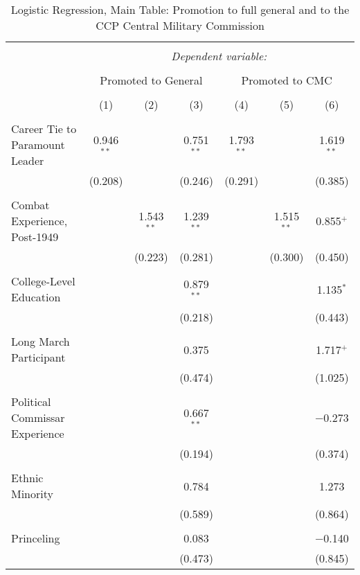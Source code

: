 \documentclass[12pt,letterpaper]{article}
\begin{document}
\begin{table}[!htbp] \centering 
	\caption{Logistic Regression, Main Table: Promotion to full general and to the CCP Central Military Commission} 
	\label{table_a8} 
	\begin{tabular}{@{\extracolsep{5pt}}lcccccc} 
		\\[-1.8ex]\hline 
		\hline \\[-1.8ex] 
		& \multicolumn{6}{c}{\textit{Dependent variable:}} \\ 
		\cline{2-7} 
		\\[-1.8ex] & \multicolumn{3}{c}{Promoted to General} & \multicolumn{3}{c}{Promoted to CMC} \\ 
		\\[-1.8ex] & (1) & (2) & (3) & (4) & (5) & (6)\\ 
		\hline \\[-1.8ex] 
		Career Tie to Paramount Leader & 0.946$^{**}$ &  & 0.751$^{**}$ & 1.793$^{**}$ &  & 1.619$^{**}$ \\ 
		& (0.208) &  & (0.246) & (0.291) &  & (0.385) \\ 
		& & & & & & \\ 
		Combat Experience, Post-1949 &  & 1.543$^{**}$ & 1.239$^{**}$ &  & 1.515$^{**}$ & 0.855$^{+}$ \\ 
		&  & (0.223) & (0.281) &  & (0.300) & (0.450) \\ 
		& & & & & & \\ 
		College-Level Education &  &  & 0.879$^{**}$ &  &  & 1.135$^{*}$ \\ 
		&  &  & (0.218) &  &  & (0.443) \\ 
		& & & & & & \\ 
		Long March Participant &  &  & 0.375 &  &  & 1.717$^{+}$ \\ 
		&  &  & (0.474) &  &  & (1.025) \\ 
		& & & & & & \\ 
		Political Commissar Experience &  &  & 0.667$^{**}$ &  &  & $-$0.273 \\ 
		&  &  & (0.194) &  &  & (0.374) \\ 
		& & & & & & \\ 
		Ethnic Minority &  &  & 0.784 &  &  & 1.273 \\ 
		&  &  & (0.589) &  &  & (0.864) \\ 
		& & & & & & \\ 
		Princeling &  &  & 0.083 &  &  & $-$0.140 \\ 
		&  &  & (0.473) &  &  & (0.845) \\ 

\end{tabular}
\end{table}
\end{document}
